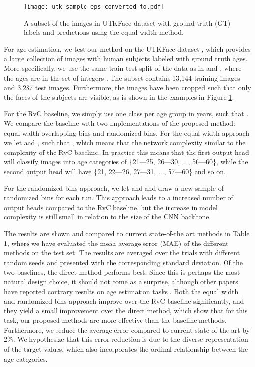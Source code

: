 \documentclass[10pt, conference, a4paper]{IEEEtran}
\begin{document}
\begin{figure}[t]
  \centering
  \texttt{[image: utk\_sample-eps-converted-to.pdf]}
  \caption{A subset of the images in UTKFace dataset \cite{zhifei2017cvpr} with ground truth (GT) labels and predictions using the equal width method.}
\label{utk_preview}
\end{figure}

For age estimation, we test our method on the UTKFace dataset \cite{zhifei2017cvpr}, which provides a large collection of images with human subjects labeled with ground truth ages. More specifically, we use the same train-test split of the data as in \cite{cao2019rank} and \cite{gustafsson2019dctd}, where the ages are in the set of integers . The subset contains 13,144 training images and 3,287 test images. Furthermore, the images have been cropped such that only the faces of the subjects are visible, as is shown in the examples in Figure \ref{utk_preview}. 

For the RvC baseline, we simply use one class per age group in years, such that . We compare the baseline with two implementations of the proposed method: equal-width overlapping bins and randomized bins. For the equal width approach we let  and , such that , which means that the network complexity similar to the complexity of the RvC baseline. In practice this means that the first output head will classify images into age categories of \{21---25, 26---30, ..., 56---60\}, while the second output head will have \{21, 22---26, 27---31, ..., 57---60\} and so on.

For the randomized bins approach, we let  and  and draw a new sample of randomized bins for each run. This approach leads to a increased number of output heads compared to the RvC baseline, but the increase in model complexity is still small in relation to the size of the CNN backbone.

The results are shown and compared to current state-of-the art methods in Table 1, where we have evaluated the mean average error (MAE) of the different methods on the test set. The results are averaged over the trials with different random seeds and presented with the corresponding standard deviation. Of the two baselines, the direct method performs best. Since this is perhaps the most natural design choice, it should not come as a surprise, although other papers have reported contrary results on age estimation tasks \cite{rothe2015dex}. Both the equal width and randomized bins approach improve over the RvC baseline significantly, and they yield a small improvement over the direct method, which show that for this task, our proposed methods are more effective than the baseline methods. Furthermore, we reduce the average error compared to current state of the art by 2\%. We hypothesize that this error reduction is due to the diverse representation of the target values, which also incorporates the ordinal relationship between the age categories.
\end{document}
